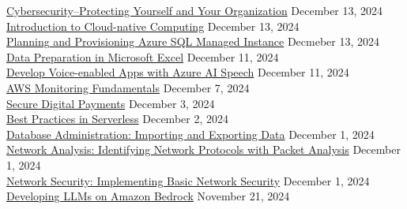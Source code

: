 \documentclass[10pt]{res} %
\begin{document}
\begin{resume}
\href{https://bjdelacruz.dev/files/certificates/pluralsight/Cybersecurity_Protecting_Yourself_and_Your_Organization.pdf}{\color{blue}Cybersecurity--Protecting Yourself and Your Organization} \hfill December 13, 2024 \\
\href{https://bjdelacruz.dev/files/certificates/pluralsight/Introduction_to_Cloud-native_Computing.pdf}{\color{blue}Introduction to Cloud-native Computing} \hfill December 13, 2024 \\
\href{https://bjdelacruz.dev/files/certificates/pluralsight/Planning_and_Provisioning_Azure_SQL_Managed_Instance.pdf}{\color{blue}Planning and Provisioning Azure SQL Managed Instance} \hfill Decmeber 13, 2024 \\
\href{https://bjdelacruz.dev/files/certificates/pluralsight/Data_Preparation_in_Microsoft_Excel.pdf}{\color{blue}Data Preparation in Microsoft Excel} \hfill December 11, 2024 \\
\href{https://bjdelacruz.dev/files/certificates/pluralsight/Develop_Voice-enabled_Apps_with_Azure_AI_Speech.pdf}{\color{blue}Develop Voice-enabled Apps with Azure AI Speech} \hfill December 11, 2024 \\
\href{https://bjdelacruz.dev/files/certificates/pluralsight/AWS_Monitoring_Fundamentals.pdf}{\color{blue}AWS Monitoring Fundamentals} \hfill December 7, 2024 \\
\href{https://bjdelacruz.dev/files/certificates/pluralsight/Secure_Digital_Payments.pdf}{\color{blue}Secure Digital Payments} \hfill December 3, 2024 \\
\href{https://bjdelacruz.dev/files/certificates/pluralsight/Best_Practices_in_Serverless.pdf}{\color{blue}Best Practices in Serverless} \hfill December 2, 2024 \\
\href{https://bjdelacruz.dev/files/certificates/pluralsight/Database_Administration_-_Importing_and_Exporting_Data.pdf}{\color{blue}Database Administration: Importing and Exporting Data} \hfill December 1, 2024 \\
\href{https://bjdelacruz.dev/files/certificates/pluralsight/Network_Analysis_-_Identifying_Network_Protocols_with_Packet_Analysis.pdf}{\color{blue}Network Analysis: Identifying Network Protocols with Packet Analysis} \hfill December 1, 2024 \\
\href{https://bjdelacruz.dev/files/certificates/pluralsight/Network_Security_-_Implementing_Basic_Network_Security.pdf}{\color{blue}Network Security: Implementing Basic Network Security} \hfill December 1, 2024 \\
\href{https://bjdelacruz.dev/files/certificates/pluralsight/Developing_LLMs_on_Amazon_Bedrock.pdf}{\color{blue}Developing LLMs on Amazon Bedrock} \hfill November 21, 2024 \\

\end{resume}
\end{document}
